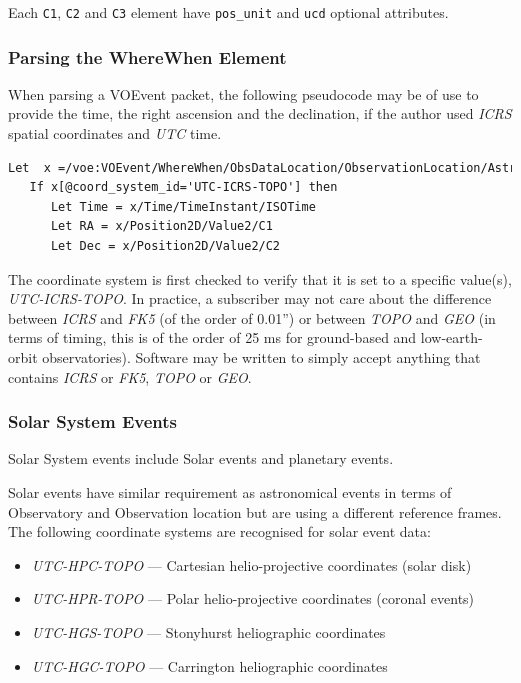 \documentclass[11pt,a4paper]{ivoa}
\begin{document}
Each {\tt C1}, {\tt C2} and {\tt C3} element have {\tt pos\_unit} and {\tt ucd}
optional attributes. 

\subsubsection{Parsing the WhereWhen Element}
\label{sec:3.4.3}
When parsing a VOEvent packet, the following pseudocode may be of use to provide
the time, the right ascension and the declination, if the author used 
\emph{ICRS} spatial coordinates and \emph{UTC} time. 
\begin{lstlisting}[language=XML]
Let  x =/voe:VOEvent/WhereWhen/ObsDataLocation/ObservationLocation/AstroCoords
   If x[@coord_system_id='UTC-ICRS-TOPO'] then
      Let Time = x/Time/TimeInstant/ISOTime
      Let RA = x/Position2D/Value2/C1
      Let Dec = x/Position2D/Value2/C2 
\end{lstlisting}

The coordinate system is first checked to verify that it is set to a specific 
value(s), \emph{UTC-ICRS-TOPO}. In practice, a subscriber may not care about the
difference between \emph{ICRS} and \emph{FK5} (of the order of 0.01'') or 
between \emph{TOPO} and \emph{GEO} (in terms of timing, this is of the order of
25 ms for ground-based and low-earth-orbit observatories). Software may be 
written to simply accept anything that contains \emph{ICRS} or \emph{FK5},
\emph{TOPO} or \emph{GEO}. 


\subsubsection{Solar System Events}
\label{sec:3.4.4}
Solar System events include Solar events and planetary events. 

Solar events have similar requirement as astronomical events in terms of 
Observatory and Observation location but are using a different reference frames.
The following coordinate systems are recognised for solar event data: 
\begin{itemize}
\item \emph{UTC-HPC-TOPO} --- Cartesian helio-projective coordinates (solar 
disk)
\item \emph{UTC-HPR-TOPO} --- Polar helio-projective coordinates (coronal 
events)
\item \emph{UTC-HGS-TOPO} --- Stonyhurst heliographic coordinates
\item \emph{UTC-HGC-TOPO} --- Carrington heliographic coordinates
\end{itemize}
\end{document}
